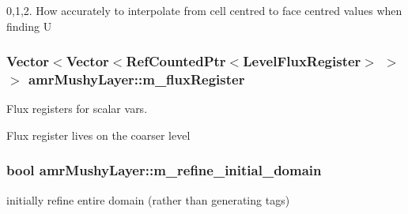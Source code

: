 0,1,2. How accurately to interpolate from cell centred to face centred values when finding U \hypertarget{classamr_mushy_layer_a012cf527ccae6d0b358f1a9cd9ef2a50}{
\subsubsection[{m\-\_\-flux\-Register}]{\setlength{\rightskip}{0pt plus 5cm}Vector$<$Vector$<$Ref\-Counted\-Ptr$<$Level\-Flux\-Register$>$ $>$ $>$ amr\-Mushy\-Layer\-::m\-\_\-flux\-Register\hspace{0.3cm}{\ttfamily [protected]}}}\label{classamr_mushy_layer_a012cf527ccae6d0b358f1a9cd9ef2a50}


Flux registers for scalar vars. 

Flux register lives on the coarser level \hypertarget{classamr_mushy_layer_a9a6dfcb69360b920e0eb7d995ed4c144}{
\subsubsection[{m\-\_\-refine\-\_\-initial\-\_\-domain}]{\setlength{\rightskip}{0pt plus 5cm}bool amr\-Mushy\-Layer\-::m\-\_\-refine\-\_\-initial\-\_\-domain\hspace{0.3cm}{\ttfamily [protected]}}}\label{classamr_mushy_layer_a9a6dfcb69360b920e0eb7d995ed4c144}


initially refine entire domain (rather than generating tags) 

